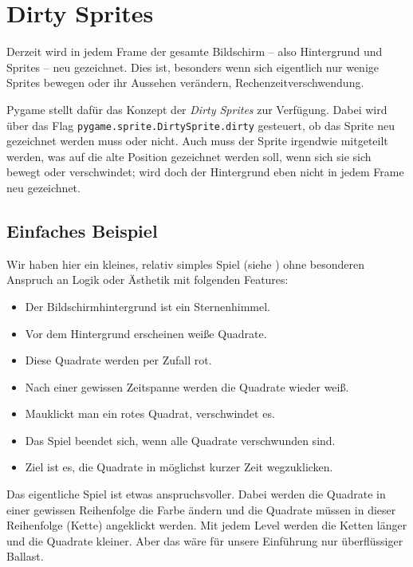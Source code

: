 \section{Dirty Sprites}
Derzeit wird in jedem Frame der gesamte Bildschirm -- also Hintergrund und Sprites -- neu gezeichnet. Dies ist, besonders wenn sich eigentlich nur wenige Sprites bewegen oder ihr Aussehen verändern, Rechenzeitverschwendung. 

Pygame stellt dafür das Konzept der \emph{Dirty Sprites} zur Verfügung. Dabei wird über das Flag \texttt{pygame.sprite.DirtySprite.dirty} gesteuert, ob das Sprite neu gezeichnet werden muss oder nicht. Auch muss der Sprite irgendwie mitgeteilt werden, was auf die alte Position gezeichnet werden soll, wenn sich sie sich bewegt oder verschwindet; wird doch der Hintergrund eben nicht in jedem Frame neu gezeichnet.



\subsection{Einfaches Beispiel}
Wir haben hier ein kleines, relativ simples Spiel (siehe ) ohne besonderen Anspruch an Logik oder Ästhetik mit folgenden Features:
\begin{itemize}
	\item Der Bildschirmhintergrund ist ein Sternenhimmel.
	\item Vor dem Hintergrund erscheinen weiße Quadrate. 
	\item Diese Quadrate werden per Zufall rot.
	\item Nach einer gewissen Zeitspanne werden die Quadrate wieder weiß.
	\item Mauklickt man ein rotes Quadrat, verschwindet es.
	\item Das Spiel beendet sich, wenn alle Quadrate verschwunden sind.
	\item Ziel ist es, die Quadrate in möglichst kurzer Zeit wegzuklicken.
\end{itemize}

Das eigentliche Spiel ist etwas anspruchsvoller. Dabei werden die Quadrate in einer gewissen Reihenfolge die Farbe ändern und die Quadrate müssen in dieser Reihenfolge (Kette) angeklickt werden. Mit jedem Level werden die Ketten länger und die Quadrate kleiner. Aber das wäre für unsere Einführung  nur überflüssiger Ballast.

